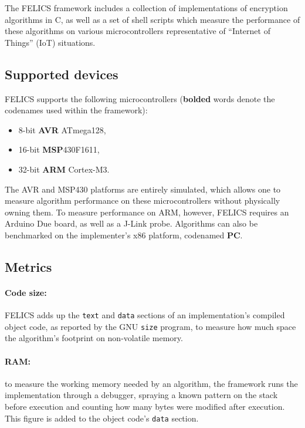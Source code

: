 \documentclass{article}
\begin{document}
The FELICS framework\cite{FELICS:paper} includes a collection of
implementations of encryption algorithms in C, as well as a set of
shell scripts which measure the performance of these algorithms on
various microcontrollers representative of ``Internet of Things''
(IoT) situations.

\subsection{Supported devices}
\label{sec:felics/devices}

FELICS supports the following microcontrollers (\textbf{bolded} words
denote the codenames used within the framework):

\begin{itemize}
\item 8-bit \textbf{AVR} ATmega128,
\item 16-bit \textbf{MSP}430F1611,
\item 32-bit \textbf{ARM} Cortex-M3.
\end{itemize}

The AVR and MSP430 platforms are entirely simulated, which allows one
to measure algorithm performance on these microcontrollers without
physically owning them.  To measure performance on ARM, however,
FELICS requires an Arduino Due board, as well as a J-Link probe.
Algorithms can also be benchmarked on the implementer's x86 platform,
codenamed \textbf{PC}.

\subsection{Metrics}
\label{sec:felics/metrics}

\paragraph{Code size:} FELICS adds up the \texttt{text} and
\texttt{data} sections of an implementation's compiled object code, as
reported by the GNU \texttt{size} program, to measure how much space
the algorithm's footprint on non-volatile memory.

\paragraph{RAM:} to measure the working memory needed by an algorithm,
the framework runs the implementation through a debugger, spraying a
known pattern on the stack before execution and counting how many
bytes were modified after execution.  This figure is added to the
object code's \texttt{data} section.
\end{document}
